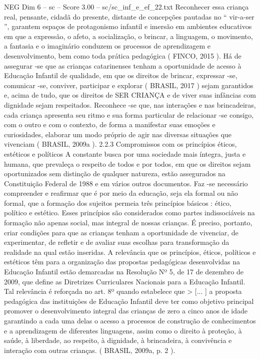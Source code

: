 \begin{textsample}{NEG Dim 6 – sc – Score 3.00 – sc/sc\_inf\_e\_ef\_22.txt}
Reconhecer essa criança real, pensante, cidadã do presente, distante de concepções pautadas no “ vir-a-ser ”, garantem espaços de protagonismo infantil e imersão em ambientes educativos em que a expressão, o afeto, a socialização, o brincar, a linguagem, o movimento, a fantasia e o imaginário conduzem os processos de aprendizagem e desenvolvimento, bem como toda prática pedagógica ( FINCO, 2015 ).
Há de assegurar -se que as crianças catarinenses tenham a oportunidade de acesso à Educação Infantil de qualidade, em que os direitos de brincar, expressar -se, comunicar -se, conviver, participar e explorar ( BRASIL, 2017 ) sejam garantidos e, acima de tudo, que os direitos de SER CRIANÇA e de viver suas infâncias com dignidade sejam respeitados.
Reconhece -se que, nas interações e nas brincadeiras, cada criança apresenta seu ritmo e sua forma particular de relacionar -se consigo, com o outro e com o contexto, de forma a manifestar suas emoções e curiosidades, elaborar um modo próprio de agir nas diversas situações que vivenciam ( BRASIL, 2009a ). 2.2.3 Compromissos com os princípios éticos, estéticos e políticos A constante busca por uma sociedade mais íntegra, justa e humana, que prevaleça o respeito de todos e por todos, em que os direitos sejam oportunizados sem distinção de qualquer natureza, estão assegurados na Constituição Federal de 1988 e em vários outros documentos.
Faz -se necessário compreender e reafirmar que é por meio da educação, seja ela formal ou não formal, que a formação dos sujeitos permeia três princípios básicos : ético, político e estético.
Esses princípios são considerados como partes indissociáveis na formação não apenas social, mas integral de nossas crianças.
É preciso, portanto, criar condições para que as crianças tenham a oportunidade de vivenciar, de experimentar, de refletir e de avaliar suas escolhas para transformação da realidade na qual estão inseridas.
A relevância que os princípios, éticos, políticos e estéticos têm para a organização das propostas pedagógicas desenvolvidas na Educação Infantil estão demarcadas na Resolução Nº 5, de 17 de dezembro de 2009, que define as Diretrizes Curriculares Nacionais para a Educação Infantil.
Tal relevância é reforçada no art. 8º quando estabelece que > [... ] a proposta pedagógica das instituições de Educação Infantil deve ter como objetivo principal promover o desenvolvimento integral das crianças de zero a cinco anos de idade garantindo a cada uma delas o acesso a processos de construção de conhecimentos e a aprendizagem de diferentes linguagens, assim como o direito à proteção, à saúde, à liberdade, ao respeito, à dignidade, à brincadeira, à convivência e interação com outras crianças. ( BRASIL, 2009a, p. 2 ).

\end{textsample}
